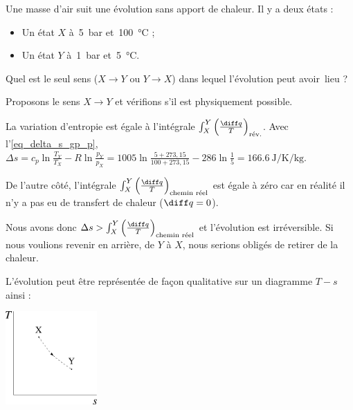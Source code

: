 		\begin{anexample}
			Une masse d’air suit une évolution sans apport de chaleur. Il y a deux états :
				\begin{itemize}
					\item Un état $X$ à~\SI{5}{\bar} et~\SI{100}{\degreeCelsius} ;
					\item Un état $Y$ à~\SI{1}{\bar} et~\SI{5}{\degreeCelsius}.
				\end{itemize}
			Quel est le seul sens ($X \to Y$ ou $Y \to X$) dans lequel l’évolution peut avoir~lieu ?
						
				\begin{answer}
					Proposons le sens $X \to Y$ et vérifions s’il est physiquement possible.
					
					La variation d’entropie est égale à l’intégrale $\int_X^Y \left(\frac{\diff q}{T}\right)_\text{rév.}$. Avec l’\cref{eq_delta_s_gp_p}, $\Delta s = c_p \ln \frac{T_Y}{T_X} - R \ln \frac{p_Y}{p_X} = \num{1005} \ln \frac{5+273,15}{100+273,15} - \num{286} \ln\frac{1}{5}=  \SI{+166,6}{\joule\per\kelvin\per\kilogram}$.

					De l’autre côté, l’intégrale $\int_X^Y \left(\frac{\diff q}{T}\right)_\text{chemin réel}$ est égale à zéro car en réalité il n’y a pas eu de transfert de chaleur ($\diff q = 0$).
					
					Nous avons donc $\Delta s > \int_X^Y \left(\frac{\diff q}{T}\right)_\text{chemin réel}$ et l’évolution est irréversible. Si nous voulions revenir en arrière, de $Y$ à $X$, nous serions obligés de retirer de la chaleur.
					
					L’évolution peut être représentée de façon qualitative sur un diagramme $T-s$ ainsi :
						\begin{center}\onlyframabook{\vspace{-0.1cm}}\includegraphics[width=3.5cm]{images/exe_ts_7.png}\onlyframabook{\vspace{0.1cm}}\end{center}
				\end{answer}
		\end{anexample}

		

